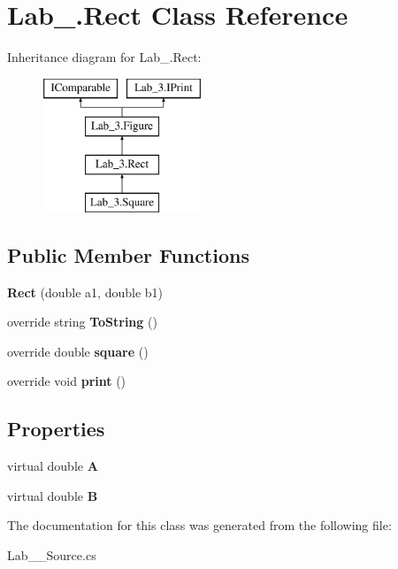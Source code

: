 \hypertarget{class_lab__3_1_1_rect}{}\section{Lab\+\_.\+Rect Class Reference}
\label{class_lab__3_1_1_rect}
Inheritance diagram for Lab\+\_.\+Rect\+:\begin{figure}[H]
\begin{center}
\leavevmode
\includegraphics[height=4.000000cm]{class_lab__3_1_1_rect}
\end{center}
\end{figure}
\subsection*{Public Member Functions}
\begin{DoxyCompactItemize}
\item 
\mbox{\label{class_lab__3_1_1_rect_a285ef8c42d2a06f04f09ef6e7b9c22f9}} 
{\bfseries Rect} (double a1, double b1)
\item 
\mbox{\label{class_lab__3_1_1_rect_addfcdb058f6a7440f43dbcf30fde6104}} 
override string {\bfseries To\+String} ()
\item 
\mbox{\label{class_lab__3_1_1_rect_a79f99909e2828a192aee47e2f85cb3fc}} 
override double {\bfseries square} ()
\item 
\mbox{\label{class_lab__3_1_1_rect_ac7cc4646c13003bd1b373fd2177ac84d}} 
override void {\bfseries print} ()
\end{DoxyCompactItemize}
\subsection*{Properties}
\begin{DoxyCompactItemize}
\item 
\mbox{\label{class_lab__3_1_1_rect_aa7abab101cbf1b8dec773453d51f5377}} 
virtual double {\bfseries A}
\item 
\mbox{\label{class_lab__3_1_1_rect_a1c568dcd9446e9e36736d38e691bd23f}} 
virtual double {\bfseries B}
\end{DoxyCompactItemize}


The documentation for this class was generated from the following file\+:\begin{DoxyCompactItemize}
\item 
Lab\+\_\+\_\+\+Source.\+cs\end{DoxyCompactItemize}
